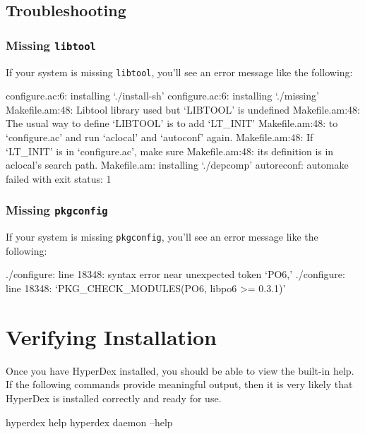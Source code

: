 \subsection{Troubleshooting}
\label{sec:installation:troubleshooting}

\subsubsection{Missing \texttt{libtool}}
\label{sec:installation:troubleshooting:libtool}

If your system is missing \texttt{libtool}, you'll see an error message like the
following:

\begin{consolecode}
configure.ac:6: installing `./install-sh'
configure.ac:6: installing `./missing'
Makefile.am:48: Libtool library used but `LIBTOOL' is undefined
Makefile.am:48:   The usual way to define `LIBTOOL' is to add `LT_INIT'
Makefile.am:48:   to `configure.ac' and run `aclocal' and `autoconf' again.
Makefile.am:48:   If `LT_INIT' is in `configure.ac', make sure
Makefile.am:48:   its definition is in aclocal's search path.
Makefile.am: installing `./depcomp'
autoreconf: automake failed with exit status: 1
\end{consolecode}

\subsubsection{Missing \texttt{pkgconfig}}
\label{sec:installation:troubleshooting:pkgconfig}

If your system is missing \texttt{pkgconfig}, you'll see an error message like
the following:

\begin{consolecode}
./configure: line 18348: syntax error near unexpected token `PO6,'
./configure: line 18348: `PKG_CHECK_MODULES(PO6, libpo6 >= 0.3.1)'
\end{consolecode}

\section{Verifying Installation}
\label{sec:installation:verify}

Once you have HyperDex installed, you should be able to view the built-in help.
If the following commands provide meaningful output, then it is very likely that
HyperDex is installed correctly and ready for use.

\begin{consolecode}
hyperdex help
hyperdex daemon --help
\end{consolecode}

